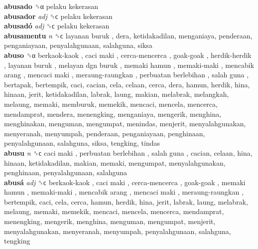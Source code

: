 \textbf{abusado} ␝α   pelaku kekerasan   \\
\textbf{abusador} \emph{adj}  ␝ϲ   pelaku kekerasan   \\
\textbf{abusadó} \emph{adj}  ␝ϲ   pelaku kekerasan   \\
\textbf{abusamentu} \emph{n}  ␝ϲ   layanan buruk , dera, ketidakadilan, menganiaya, penderaan, penganiayaan, penyalahgunaan, salahguna, siksa  \\
\textbf{abuso} ␝α   berkaok-kaok ,  caci maki ,  cerca-mencerca ,  goak-goak ,  herdik-herdik ,  layanan buruk ,  melayan dgn buruk ,  memaki hamun ,  memaki-maki ,  mencabik arang ,  mencaci maki ,  meraung-raungkan ,  perbuatan berlebihan ,  salah guna , bertapak, bertempik, caci, cacian, cela, celaan, cerca, dera, hamun, herdik, hina, hinaan, jerit, ketidakadilan, labrak, laung, makian, melabrak, melangkah, melaung, memaki, memburuk, memekik, mencaci, mencela, mencerca, mendamprat, mendera, menengking, menganiaya, mengerik, menghina, menghinakan, menguman, mengumpat, menindas, menjerit, menyalahgunakan, menyeranah, menyumpah, penderaan, penganiayaan, penghinaan, penyalahgunaan, salahguna, siksa, tengking, tindas  \\
\textbf{abusu} \emph{n}  ␝ϲ   caci maki ,  perbuatan berlebihan ,  salah guna , cacian, celaan, hina, hinaan, ketidakadilan, makian, memaki, mengumpat, menyalahgunakan, penghinaan, penyalahgunaan, salahguna  \\
\textbf{abusá} \emph{adj}  ␝ϲ   berkaok-kaok ,  caci maki ,  cerca-mencerca ,  goak-goak ,  memaki hamun ,  memaki-maki ,  mencabik arang ,  mencaci maki ,  meraung-raungkan , bertempik, caci, cela, cerca, hamun, herdik, hina, jerit, labrak, laung, melabrak, melaung, memaki, memekik, mencaci, mencela, mencerca, mendamprat, menengking, mengerik, menghina, menguman, mengumpat, menjerit, menyalahgunakan, menyeranah, menyumpah, penyalahgunaan, salahguna, tengking  \\

